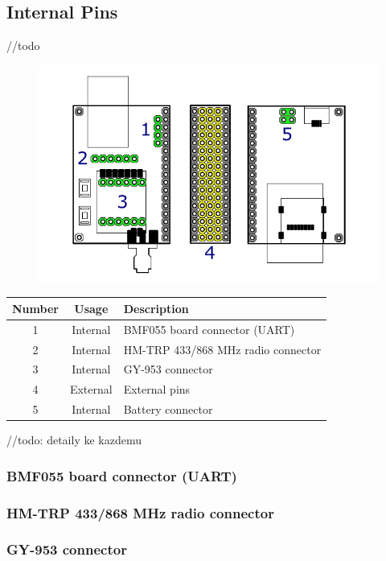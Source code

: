 \subsection{Internal Pins}
//todo

\begin{figure}[H]
	\includegraphics[scale=1]{img/pinSections.pdf}
\end{figure}

\begin{table}[H]
	\begin{tabular}{|c|c|l|}
		\hline
		Number & Usage & Description \\
		\hline
		1 & Internal & BMF055 board connector (UART) \\
		2 & Internal & HM-TRP 433/868 MHz radio connector \\
		3 & Internal & GY-953 connector \\
		4 & External & External pins \\
		5 & Internal & Battery connector \\
		\hline
	\end{tabular}
\end{table}

//todo: detaily ke kazdemu

\subsubsection{BMF055 board connector (UART)}
\subsubsection{HM-TRP 433/868 MHz radio connector}
\subsubsection{GY-953 connector}
